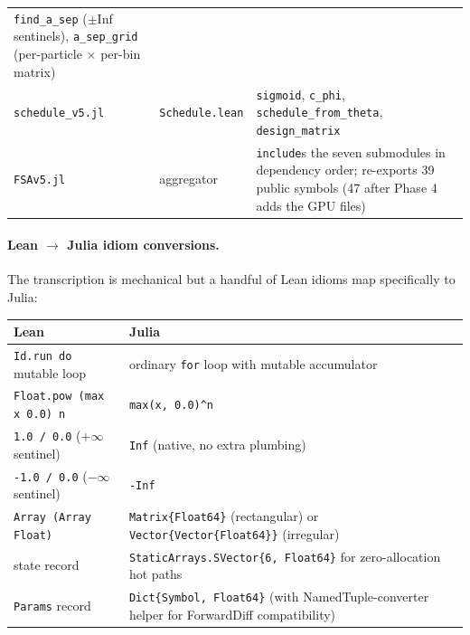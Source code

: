 \documentclass[11pt,a4paper]{article}
\begin{document}
\begin{center}
\begin{tabular}{p{34mm}p{40mm}p{72mm}}
                                \texttt{find\_a\_sep} ($\pm$Inf sentinels),
                                \texttt{a\_sep\_grid}
                                (per-particle $\times$ per-bin matrix) \\
\texttt{schedule\_v5.jl}      & \texttt{Schedule.lean}
                              & \texttt{sigmoid}, \texttt{c\_phi},
                                \texttt{schedule\_from\_theta},
                                \texttt{design\_matrix} \\
\texttt{FSAv5.jl}             & aggregator
                              & \texttt{include}s the seven submodules
                                in dependency order; re-exports 39
                                public symbols (47 after Phase 4
                                adds the GPU files) \\
\bottomrule
\end{tabular}
\end{center}

\paragraph{Lean $\to$ Julia idiom conversions.} The transcription is
mechanical but a handful of Lean idioms map specifically to Julia:

\begin{center}\footnotesize
\begin{tabular}{ll}
\toprule
Lean & Julia \\
\midrule
\texttt{Id.run do} mutable loop                & ordinary \texttt{for} loop with mutable accumulator \\
\texttt{Float.pow (max x 0.0) n}               & \texttt{max(x, 0.0)\^{}n} \\
\texttt{1.0 / 0.0} ($+\infty$ sentinel)        & \texttt{Inf} (native, no extra plumbing) \\
\texttt{-1.0 / 0.0} ($-\infty$ sentinel)        & \texttt{-Inf} \\
\texttt{Array (Array Float)}                   & \texttt{Matrix\{Float64\}} (rectangular) or \texttt{Vector\{Vector\{Float64\}\}} (irregular) \\
state record                                    & \texttt{StaticArrays.SVector\{6, Float64\}} for zero-allocation hot paths \\
\texttt{Params} record                          & \texttt{Dict\{Symbol, Float64\}} (with NamedTuple-converter helper for ForwardDiff compatibility) \\
\bottomrule
\end{tabular}
\end{center}
\end{document}
